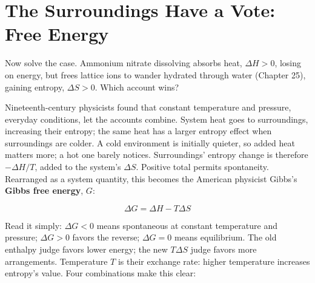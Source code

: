 \section{The Surroundings Have a Vote: Free Energy}

Now solve the case. Ammonium nitrate dissolving absorbs heat, $\Delta H>0$, losing on energy, but frees lattice ions to wander hydrated through water (Chapter 25), gaining entropy, $\Delta S>0$. Which account wins?

Nineteenth-century physicists found that constant temperature and pressure, everyday conditions, let the accounts combine. System heat goes to surroundings, increasing their entropy; the same heat has a larger entropy effect when surroundings are colder. A cold environment is initially quieter, so added heat matters more; a hot one barely notices. Surroundings' entropy change is therefore $-\Delta H/T$, added to the system's $\Delta S$. Positive total permits spontaneity. Rearranged as a system quantity, this becomes the American physicist Gibbs's \textbf{Gibbs free energy}, $G$:

\[\Delta G = \Delta H - T\Delta S\]

Read it simply: $\Delta G<0$ means spontaneous at constant temperature and pressure; $\Delta G>0$ favors the reverse; $\Delta G=0$ means equilibrium. The old enthalpy judge favors lower energy; the new $T\Delta S$ judge favors more arrangements. Temperature $T$ is their exchange rate: higher temperature increases entropy's value. Four combinations make this clear:

